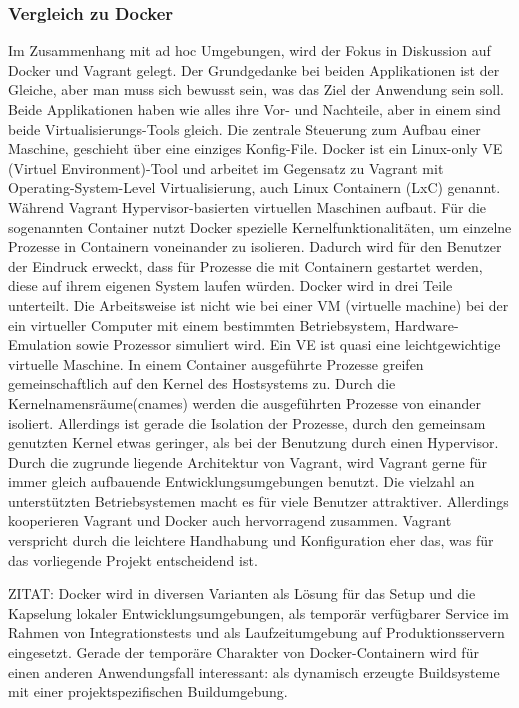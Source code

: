 \subsubsection{Vergleich zu Docker}
Im Zusammenhang mit ad hoc Umgebungen, wird der Fokus in Diskussion auf Docker und Vagrant gelegt.
Der Grundgedanke bei beiden Applikationen ist der Gleiche, aber man muss sich bewusst sein, was das Ziel der Anwendung sein soll.
Beide Applikationen haben wie alles ihre Vor- und Nachteile, aber in einem sind beide Virtualisierungs-Tools gleich. Die zentrale Steuerung zum Aufbau einer Maschine, geschieht über eine einziges Konfig-File.\newline
Docker ist ein Linux-only VE (Virtuel Environment)-Tool und arbeitet im Gegensatz zu Vagrant mit Operating-System-Level Virtualisierung, auch Linux Containern (LxC) genannt. Während Vagrant Hypervisor-basierten virtuellen Maschinen aufbaut.
Für die sogenannten Container nutzt Docker spezielle Kernelfunktionalitäten, um einzelne Prozesse in Containern voneinander zu isolieren.\newline 
Dadurch wird für den Benutzer der Eindruck erweckt, dass für Prozesse die mit Containern gestartet werden, diese auf ihrem eigenen System laufen würden.
Docker wird in drei Teile unterteilt. Die Arbeitsweise ist nicht wie bei einer VM (virtuelle machine) bei der ein virtueller Computer mit einem bestimmten Betriebsystem, Hardware-Emulation sowie Prozessor simuliert wird. Ein VE ist quasi eine leichtgewichtige virtuelle Maschine. In einem Container ausgeführte Prozesse greifen gemeinschaftlich auf den Kernel des Hostsystems zu. Durch die Kernelnamensräume(cnames) werden die ausgeführten Prozesse von einander isoliert. Allerdings ist gerade die Isolation der Prozesse, durch den gemeinsam genutzten Kernel etwas geringer, als bei der Benutzung durch einen Hypervisor.\newline
Durch die zugrunde liegende Architektur von Vagrant, wird Vagrant gerne für immer gleich aufbauende Entwicklungsumgebungen benutzt.
Die vielzahl an unterstützten Betriebsystemen macht es für viele Benutzer attraktiver. Allerdings kooperieren Vagrant und Docker auch hervorragend zusammen.
Vagrant verspricht durch die leichtere Handhabung und Konfiguration eher das, was für das vorliegende Projekt entscheidend ist.



ZITAT: Docker wird in diversen Varianten als Lösung für das Setup und die Kapselung lokaler Entwicklungsumgebungen, als temporär verfügbarer Service im Rahmen von Integrationstests und als Laufzeitumgebung auf Produktionsservern eingesetzt. Gerade der temporäre Charakter von Docker-Containern wird für einen anderen Anwendungsfall interessant: als dynamisch erzeugte Buildsysteme mit einer projektspezifischen Buildumgebung.

